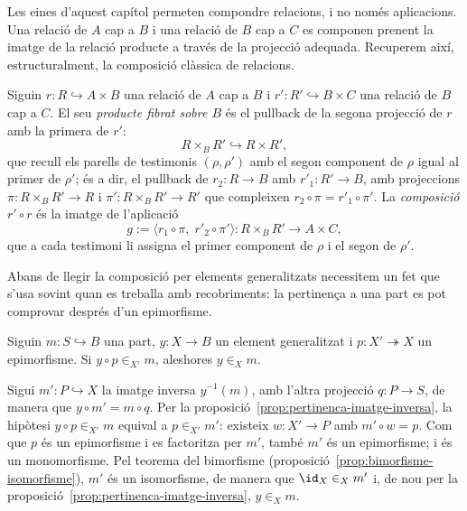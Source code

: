 Les eines d'aquest capítol permeten compondre relacions, i no només
aplicacions. Una relació de \(A\) cap a \(B\) i una relació de \(B\) cap a
\(C\) es componen prenent la imatge de la relació producte a través de la
projecció adequada. Recuperem així, estructuralment, la composició
clàssica de relacions.

\begin{definicio}\label{def:composicio-relacions}
Siguin \(r\colon R\hookrightarrow A\times B\) una relació de \(A\) cap a
\(B\) i \(r'\colon R'\hookrightarrow B\times C\) una relació de \(B\) cap
a \(C\). El seu \emph{producte fibrat sobre \(B\)} és el pullback de la
segona projecció de \(r\) amb la primera de \(r'\):
\[
R\times_B R'\hookrightarrow R\times R',
\]
que recull els parells de testimonis \((\rho,\rho')\) amb el segon
component de \(\rho\) igual al primer de \(\rho'\); és a dir, el pullback
de \(r_2\colon R\to B\) amb \(r'_1\colon R'\to B\), amb projeccions
\(\pi\colon R\times_B R'\to R\) i \(\pi'\colon R\times_B R'\to R'\) que
compleixen \(r_2\circ\pi=r'_1\circ\pi'\). La \emph{composició}
\(r'\circ r\) és la imatge de l'aplicació
\[
g:=\langle r_1\circ\pi,\;r'_2\circ\pi'\rangle\colon
R\times_B R'\longrightarrow A\times C,
\]
que a cada testimoni li assigna el primer component de \(\rho\) i el segon
de \(\rho'\).
\end{definicio}

Abans de llegir la composició per elements generalitzats necessitem un fet
que s'usa sovint quan es treballa amb recobriments: la pertinença a una
part es pot comprovar després d'un epimorfisme.

\begin{lema}\label{lema:pertinenca-recobriment}
Siguin \(m\colon S\hookrightarrow B\) una part, \(y\colon X\to B\) un
element generalitzat i \(p\colon X'\twoheadrightarrow X\) un epimorfisme.
Si \(y\circ p\in_{X'}m\), aleshores \(y\in_Xm\).
\end{lema}

\begin{prova}
Sigui \(m'\colon P\hookrightarrow X\) la imatge inversa \(y^{-1}(m)\), amb
l'altra projecció \(q\colon P\to S\), de manera que \(y\circ m'=m\circ q\).
Per la proposició~\ref{prop:pertinenca-imatge-inversa}, la hipòtesi
\(y\circ p\in_{X'}m\) equival a \(p\in_{X'}m'\): existeix
\(w\colon X'\to P\) amb \(m'\circ w=p\). Com que \(p\) és un epimorfisme i
es factoritza per \(m'\), també \(m'\) és un epimorfisme; i és un
monomorfisme. Pel teorema del bimorfisme
(proposició~\ref{prop:bimorfisme-isomorfisme}), \(m'\) és un isomorfisme,
de manera que \(\id_X\in_Xm'\) i, de nou per la
proposició~\ref{prop:pertinenca-imatge-inversa}, \(y\in_Xm\).
\end{prova}

